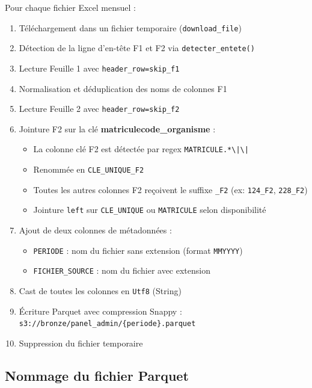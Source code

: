 \documentclass[12pt,a4paper,french]{report}
\newcommand{\bucket}[1]{\texttt{s3://#1}}
\newcommand{\colname}[1]{\texttt{#1}}
\begin{document}
Pour chaque fichier Excel mensuel :

\begin{enumerate}
  \item Téléchargement dans un fichier temporaire (\texttt{download\_file})
  \item Détection de la ligne d'en-tête F1 et F2 via
        \texttt{detecter\_entete()}
  \item Lecture Feuille 1 avec \texttt{header\_row=skip\_f1}
  \item Normalisation et déduplication des noms de colonnes F1
  \item Lecture Feuille 2 avec \texttt{header\_row=skip\_f2}
  \item Jointure F2 sur la clé \textbf{matricule\textbar\textbar{}code\_organisme} :
    \begin{itemize}[nosep]
      \item La colonne clé F2 est détectée par regex
            \texttt{MATRICULE.*\textbackslash|\textbackslash|}
      \item Renommée en \texttt{CLE\_UNIQUE\_F2}
      \item Toutes les autres colonnes F2 reçoivent le suffixe
            \texttt{\_F2} (ex: \texttt{124\_F2}, \texttt{228\_F2})
      \item Jointure \texttt{left} sur \texttt{CLE\_UNIQUE} ou
            \texttt{MATRICULE} selon disponibilité
    \end{itemize}
  \item Ajout de deux colonnes de métadonnées :
    \begin{itemize}[nosep]
      \item \colname{PERIODE} : nom du fichier sans extension
            (format \texttt{MMYYYY})
      \item \colname{FICHIER\_SOURCE} : nom du fichier avec extension
    \end{itemize}
  \item Cast de toutes les colonnes en \texttt{Utf8} (String)
  \item Écriture Parquet avec compression Snappy :
        \bucket{bronze/panel\_admin/\{periode\}.parquet}
  \item Suppression du fichier temporaire
\end{enumerate}

\subsection{Nommage du fichier Parquet}
\end{document}
